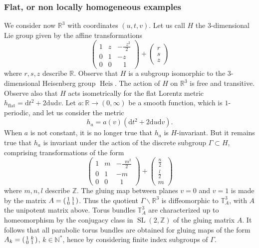 \documentclass[11pt]{article}
\theoremstyle{definition}
\numberwithin{equation}{section}
\numberwithin{figure}{section}
\numberwithin{table}{section}
\DeclareMathOperator{\SL}{SL}
\DeclareMathOperator{\flatm}{flat}
\DeclareMathOperator{\Heis}{Heis}
\newcommand*\NN{\mathbb{N}}
\newcommand*\TT{\mathbb{T}}
\newcommand*\RR{\mathbb{R}}
\newcommand*\ZZ{\mathbb{Z}}
\newenvironment{smallpmatrix}{\left(\begin{smallmatrix}}{\end{smallmatrix}\right)}
\newcommand*{\dd}{\mathrm{d}}
\newcommand*{\dt}{\dd t}
\newcommand*{\du}{\dd u}
\newcommand*{\dv}{\dd v}
\begin{document}
\subsubsection{Flat, or non locally homogeneous examples}\label{sec.exemplesparaboliques}
We consider now $\RR^3$ with coordinates $(u,t,v)$. Let us call $H$ the $3$-dimensional Lie group given by the affine transformations
\[
\begin{pmatrix} 1& z & -\frac{\;\;z^2}{2}\\ 0 & 1 & -z \\ 0& 0 & \;\;\;1
\end{pmatrix}
+
\begin{pmatrix} r\\s\\ z
\end{pmatrix}
\]
where $r,s,z$ describe $\RR$. Observe that $H$ is a subgroup isomorphic to the $3$-dimensional Heisenberg group $\Heis$. The action of $H$ on $\RR^3$ is free and transitive. Observe also that $H$ acts isometrically for the flat Lorentz metric $h_{\flatm}=\dt^2+2\du\dv$. Let $a:\RR \to (0,\infty)$ be a smooth function, which is $1$-periodic, and let us consider the metric
\[
h_a=a(v)(\dt^2+2\du\dv).
\]
When $a$ is not constant, it is no longer true that $h_a$ is $H$-invariant. But it remains true that $h_a$ is invariant under the action of the discrete subgroup $\Gamma \subset H$, comprising transformations of the form
\[
\begin{pmatrix} 1& m & -\frac{\;\;m^2}{2}\\ 0 & 1 & -m \\ 0& 0 & \;\;1
\end{pmatrix}
+ \begin{pmatrix} \frac{n}{2}\\\frac{l}{2}\\ m
\end{pmatrix}
\]
where $m,n,l$ describe $\ZZ$. The gluing map between planes $v=0$ and $v=1$ is made by the matrix $A= 
\begin{smallpmatrix} 1& 1\\0 & 1
\end{smallpmatrix}$.
Thus the quotient $\Gamma \backslash \RR^3 $ is diffeomorphic to $\TT_A^3$, with $A$ the unipotent matrix above. Torus bundles $\TT_A^3$ are characterized up to homeomorphism by the conjugacy class in $\SL(2,\ZZ)$ of the gluing matrix $A$. It follows that all parabolic torus bundles are obtained for gluing maps of the form $A_k= \begin{smallpmatrix} 1& k\\0 & 1
\end{smallpmatrix}$, $k \in \NN^*$, hence
by considering finite index subgroups of $\Gamma$.
\end{document}
